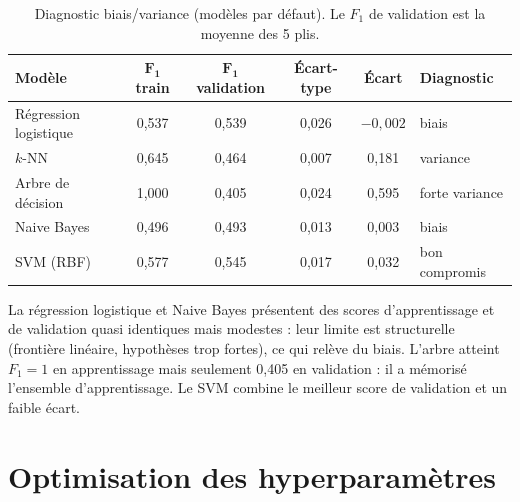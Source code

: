 \documentclass[11pt,a4paper]{article}
\newcommand{\Fun}{F_1}
\begin{document}
\begin{table}[H]
\centering
\caption{Diagnostic biais/variance (modèles par défaut). Le $\Fun$ de validation est la moyenne des 5 plis.}
\label{tab:biaisvar}
\small
\begin{tabular}{lccccl}
\toprule
\textbf{Modèle} & $\boldsymbol{\Fun}$ \textbf{train} & $\boldsymbol{\Fun}$ \textbf{validation} & \textbf{Écart-type} & \textbf{Écart} & \textbf{Diagnostic} \\
\midrule
Régression logistique & 0,537 & 0,539 & 0,026 & $-0{,}002$ & biais \\
$k$-NN                & 0,645 & 0,464 & 0,007 & 0,181 & variance \\
Arbre de décision     & 1,000 & 0,405 & 0,024 & 0,595 & forte variance \\
Naive Bayes           & 0,496 & 0,493 & 0,013 & 0,003 & biais \\
SVM (RBF)             & 0,577 & 0,545 & 0,017 & 0,032 & bon compromis \\
\bottomrule
\end{tabular}
\end{table}

La régression logistique et Naive Bayes présentent des scores d'apprentissage et de validation quasi identiques mais modestes : leur limite est structurelle (frontière linéaire, hypothèses trop fortes), ce qui relève du biais. L'arbre atteint $\Fun = 1$ en apprentissage mais seulement 0,405 en validation : il a mémorisé l'ensemble d'apprentissage. Le SVM combine le meilleur score de validation et un faible écart.

\section{Optimisation des hyperparamètres}\label{sec:optimisation}
\end{document}
